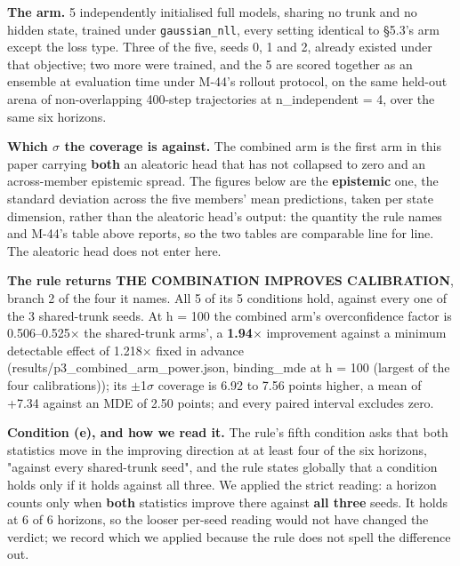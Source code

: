 \documentclass[10pt]{article}
\begin{document}
\textbf{The arm.} 5 independently initialised full models, sharing no trunk and no hidden state, trained under \texttt{gaussian\_nll}, every setting identical to \S{}5.3's arm except the loss type. Three of the five, seeds 0, 1 and 2, already existed under that objective; two more were trained, and the 5 are scored together as an ensemble at evaluation time under M-44's rollout protocol, on the same held-out arena of non-overlapping 400-step trajectories at n\_independent = 4, over the same six horizons.

\textbf{Which $\sigma$ the coverage is against.} The combined arm is the first arm in this paper carrying \textbf{both} an aleatoric head that has not collapsed to zero and an across-member epistemic spread. The figures below are the \textbf{epistemic} one, the standard deviation across the five members' mean predictions, taken per state dimension, rather than the aleatoric head's output: the quantity the rule names and M-44's table above reports, so the two tables are comparable line for line. The aleatoric head does not enter here.

\textbf{The rule returns THE COMBINATION IMPROVES CALIBRATION}, branch 2 of the four it names. All 5 of its 5 conditions hold, against every one of the 3 shared-trunk seeds. At h = 100 the combined arm's overconfidence factor is 0.506--0.525$\times$ the shared-trunk arms', a \textbf{1.94$\times$} improvement against a minimum detectable effect of 1.218$\times$ fixed in advance (results/p3\_combined\_arm\_power.json, binding\_mde at h = 100 (largest of the four calibrations)); its $\pm$1$\sigma$ coverage is 6.92 to 7.56 points higher, a mean of +7.34 against an MDE of 2.50 points; and every paired interval excludes zero.

\textbf{Condition (e), and how we read it.} The rule's fifth condition asks that both statistics move in the improving direction at at least four of the six horizons, "against every shared-trunk seed", and the rule states globally that a condition holds only if it holds against all three. We applied the strict reading: a horizon counts only when \textbf{both} statistics improve there against \textbf{all three} seeds. It holds at 6 of 6 horizons, so the looser per-seed reading would not have changed the verdict; we record which we applied because the rule does not spell the difference out.
\end{document}
